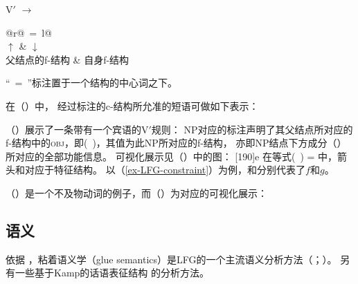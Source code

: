 \ea
V$'$ $\to$ \begin{tabular}[t]{@{}r@{~=~}l@{}}
           \\ %
           $\uparrow$ &  $\downarrow$\\ 
           父结点的f-结构 & 自身f-结构\\
           \end{tabular}
\z
“\up~=~\down”标注置于一个结构的中心词之下。

在（）中，
经过标注的c-结构所允准的短语可做如下表示：
\ea
{}%
\hspace*{3em}%
\z

\noindent
（）展示了一条带有一个宾语的V$'$规则：
\ea
{}
\z
%
NP对应的标注声明了其父结点所对应的f-结构中的\textsc{obj}，即\mbox{(\up\ \lfgobj)}，其值为此NP所对应的f-结构，
亦即NP结点下方成分（\down）所对应的全部功能信息。
可视化展示见（）中的图：
\ea
{}%
\hspace*{3em}%
[190]{e}
\z
在等式(\up\ \lfgobj) = \down{}中，箭头\up 和\down 对应于特征结构。
以（\ref{ex-LFG-constraint}）为例，\up 和\down 分别代表了$f$和$g$。

（）是一个不及物动词的例子，而（）为对应的可视化展示：

\ea
{}
\z

\ea
{}
\hspace*{4em}
\z 
{}

\subsection{语义}
\label{lfg-semantics}
\label{glue-semantics}

依据 \citet[--92]{Dalrymple2006a}，粘着语义学（glue semantics）是LFG的一个主流语义分析方法（\citealp*{DLS93a-u}；\citealp[\S~8]{Dalrymple2001a-u}）。
另有一些基于Kamp的话语表征结构 \citep{KR93a}的分析方法\citep{FR83b,FR83a}。

